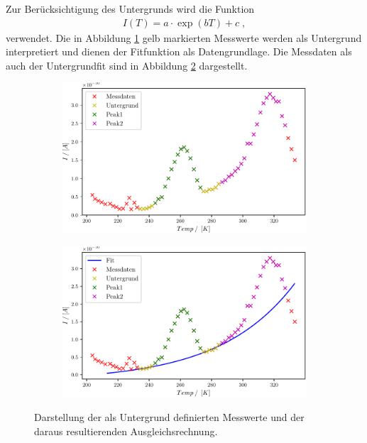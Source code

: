 Zur Berücksichtigung des Untergrunds wird die Funktion 
\begin{align}
	I(T)=a\cdot\exp{(bT)}+c \;,
	\label{fkt:fit1}
\end{align}
verwendet. Die in Abbildung \ref{fig:Auswertung_3} gelb markierten Messwerte werden als Untergrund interpretiert und dienen der Fitfunktion als Datengrundlage. Die Messdaten als auch der Untergrundfit sind in Abbildung \ref{fig:Auswertung_4} dargestellt.


\begin{figure}
\centering
\begin{subfigure}{.5\textwidth}
	\centering
	\includegraphics[width=1\textwidth]{build/1_Temp_current_background_peak_withoutfit.pdf}
	\caption{}
	\label{fig:Auswertung_3}
\end{subfigure}%
\begin{subfigure}{.5\textwidth}
	\centering
	\includegraphics[width=1\textwidth]{build/1_Temp_current_background_peak.pdf}
	\caption{}
	\label{fig:Auswertung_4}
\end{subfigure}
\caption{Darstellung der als Untergrund definierten Messwerte und der daraus resultierenden Ausgleichsrechnung.}
\label{fig:Auswertung_3_4}
\end{figure}

